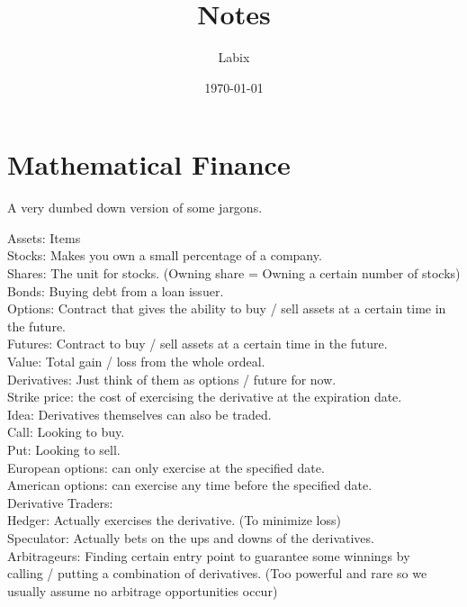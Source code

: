 \documentclass[a4paper]{article}
\title{Notes}
\author{Labix}
\date{\today}
\begin{document}
\maketitle
\begin{abstract}
\end{abstract}
\tableofcontents

\pagebreak
\section{Mathematical Finance}
A very dumbed down version of some jargons. 

Assets: Items\\
Stocks: Makes you own a small percentage of a company. \\
Shares: The unit for stocks. (Owning share = Owning a certain number of stocks)\\
Bonds: Buying debt from a loan issuer. \\
Options: Contract that gives the ability to buy / sell assets at a certain time in the future. \\
Futures: Contract to buy / sell assets at a certain time in the future. \\
Value: Total gain / loss from the whole ordeal. \\

Derivatives: Just think of them as options / future for now. \\
Strike price: the cost of exercising the derivative at the expiration date. \\

Idea: Derivatives themselves can also be traded. \\

Call: Looking to buy. \\
Put: Looking to sell. \\

European options: can only exercise at the specified date. \\
American options: can exercise any time before the specified date. \\

Derivative Traders: \\
Hedger: Actually exercises the derivative. (To minimize loss)\\
Speculator: Actually bets on the ups and downs of the derivatives. \\
Arbitrageurs: Finding certain entry point to guarantee some winnings by\\ calling / putting a combination of derivatives. (Too powerful and rare so we usually assume no arbitrage opportunities occur)\\
\end{document}
